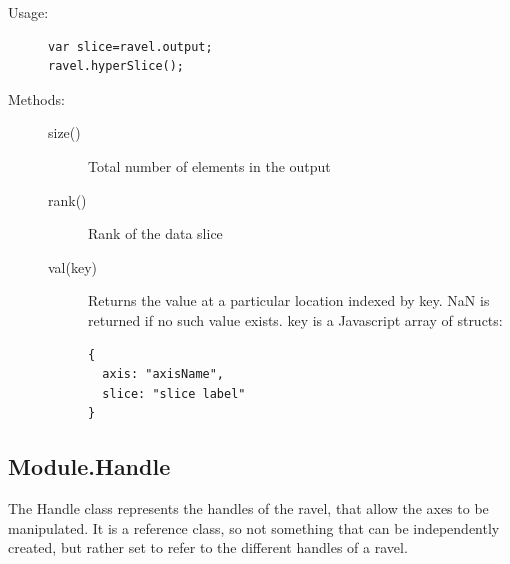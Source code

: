 \documentclass{article}
\begin{document}
\begin{description}
\item[Usage:]\mbox{}
\begin{verbatim}
var slice=ravel.output;
ravel.hyperSlice();
\end{verbatim}

\item[Methods:]\mbox{}
  \begin{description}
  \item[size()] Total number of elements in the output
  \item[rank()] Rank of the data slice
  \item[val(key)] Returns the value at a particular location indexed
    by key. NaN is returned if no such value exists. key is a
    Javascript array of structs:
\begin{verbatim}
{
  axis: "axisName",
  slice: "slice label"
}
\end{verbatim}
  \end{description}
\end{description}  

\subsection{Module.Handle}
  
The Handle class represents the handles of the ravel, that allow the
axes to be manipulated. It is a reference class, so not something that
can be independently created, but rather set to refer to the different
handles of a ravel.
\end{document}

